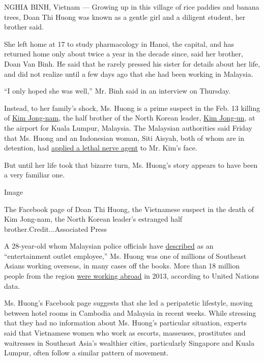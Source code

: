 NGHIA BINH, Vietnam --- Growing up in this village of rice paddies and
banana trees, Doan Thi Huong was known as a gentle girl and a diligent
student, her brother said.

She left home at 17 to study pharmacology in Hanoi, the capital, and has
returned home only about twice a year in the decade since, said her
brother, Doan Van Binh. He said that he rarely pressed his sister for
details about her life, and did not realize until a few days ago that
she had been working in Malaysia.

``I only hoped she was well,'' Mr. Binh said in an interview on
Thursday.

Instead, to her family's shock, Ms. Huong is a prime suspect in the Feb.
13 killing of
\href{https://www.nytimes3xbfgragh.onion/2017/02/15/world/asia/kim-jong-nam-assassination-north-korea.html}{Kim
Jong-nam}, the half brother of the North Korean leader,
\href{http://topics.nytimes3xbfgragh.onion/top/reference/timestopics/people/k/kim_jongun/index.html?inline=nyt-per}{Kim
Jong-un}, at the airport for Kuala Lumpur, Malaysia. The Malaysian
authorities said Friday that Ms. Huong and an Indonesian woman, Siti
Aisyah, both of whom are in detention, had
\href{https://www.nytimes3xbfgragh.onion/2017/02/23/world/asia/kim-jong-nam-vx-nerve-agent-.html}{applied
a lethal nerve agent} to Mr. Kim's face.

But until her life took that bizarre turn, Ms. Huong's story appears to
have been a very familiar one.

Image

The Facebook page of Doan Thi Huong, the Vietnamese suspect in the death
of Kim Jong-nam, the North Korean leader's estranged half
brother.Credit...Associated Press

A 28-year-old whom Malaysian police officials have
\href{http://www.nytimes3xbfgragh.onion/2017/02/22/world/asia/kim-jong-nam-assassination-korea-malaysia.html}{described}
as an ``entertainment outlet employee,'' Ms. Huong was one of millions
of Southeast Asians working overseas, in many cases off the books. More
than 18 million people from the region
\href{http://apmigration.ilo.org/resources/ilms-database-for-asean-international-migration-in-asean-at-a-glance}{were
working abroad} in 2013, according to United Nations data.

Ms. Huong's Facebook page suggests that she led a peripatetic lifestyle,
moving between hotel rooms in Cambodia and Malaysia in recent weeks.
While stressing that they had no information about Ms. Huong's
particular situation, experts said that Vietnamese women who work as
escorts, masseuses, prostitutes and waitresses in Southeast Asia's
wealthier cities, particularly Singapore and Kuala Lumpur, often follow
a similar pattern of movement.

